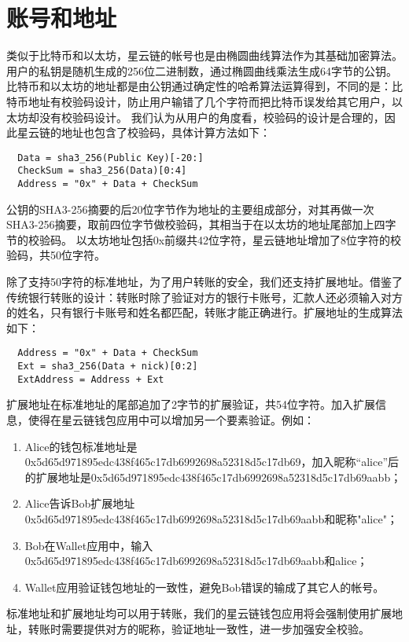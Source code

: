 \section{账号和地址}

类似于比特币和以太坊，星云链的帐号也是由椭圆曲线算法作为其基础加密算法。
用户的私钥是随机生成的256位二进制数，通过椭圆曲线乘法生成64字节的公钥。
比特币和以太坊的地址都是由公钥通过确定性的哈希算法运算得到，不同的是：比特币地址有校验码设计，防止用户输错了几个字符而把比特币误发给其它用户，以太坊却没有校验码设计。
我们认为从用户的角度看，校验码的设计是合理的，因此星云链的地址也包含了校验码，具体计算方法如下：

\begin{verbatim}
  Data = sha3_256(Public Key)[-20:]
  CheckSum = sha3_256(Data)[0:4]
  Address = "0x" + Data + CheckSum
\end{verbatim}

公钥的SHA3-256摘要的后20位字节作为地址的主要组成部分，对其再做一次SHA3-256摘要，取前四位字节做校验码，其相当于在以太坊的地址尾部加上四字节的校验码。
以太坊地址包括0x前缀共42位字符，星云链地址增加了8位字符的校验码，共50位字符。
	
	除了支持50字符的标准地址，为了用户转账的安全，我们还支持扩展地址。借鉴了传统银行转账的设计：转账时除了验证对方的银行卡账号，汇款人还必须输入对方的姓名，只有银行卡账号和姓名都匹配，转账才能正确进行。扩展地址的生成算法如下：

\begin{verbatim}
  Address = "0x" + Data + CheckSum
  Ext = sha3_256(Data + nick)[0:2]
  ExtAddress = Address + Ext
\end{verbatim}

扩展地址在标准地址的尾部追加了2字节的扩展验证，共54位字符。加入扩展信息，使得在星云链钱包应用中可以增加另一个要素验证。例如：
\begin{enumerate}
	\item Alice的钱包标准地址是0x5d65d971895edc438f465c17db6992698a52318d5c17db69，加入昵称“alice”后的扩展地址是0x5d65d971895edc438f465c17db6992698a52318d5c17db69aabb；
	\item Alice告诉Bob扩展地址 0x5d65d971895edc438f465c17db6992698a52318d5c17db69aabb和昵称"alice"；
	\item Bob在Wallet应用中，输入 0x5d65d971895edc438f465c17db6992698a52318d5c17db69aabb和alice；
	\item Wallet应用验证钱包地址的一致性，避免Bob错误的输成了其它人的帐号。
\end{enumerate}
		
标准地址和扩展地址均可以用于转账，我们的星云链钱包应用将会强制使用扩展地址，转账时需要提供对方的昵称，验证地址一致性，进一步加强安全校验。
